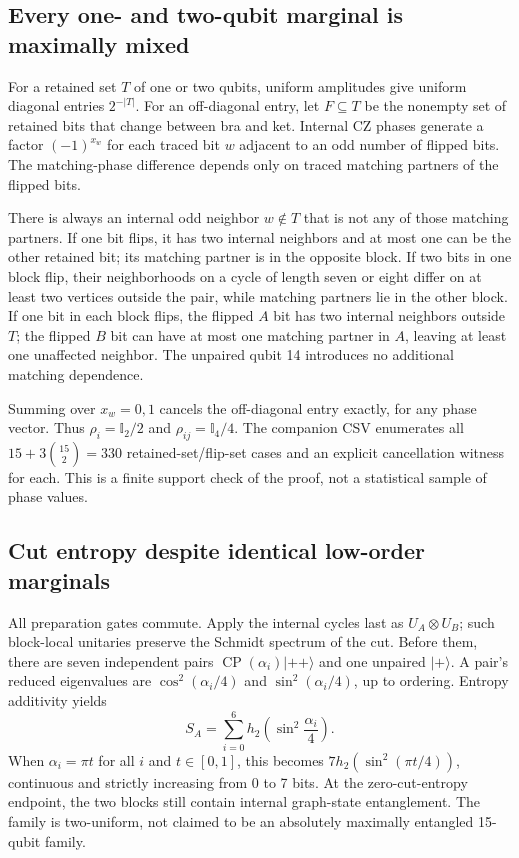 \documentclass[11pt,a4paper]{article}
\begin{document}
\subsection{Every one- and two-qubit marginal is maximally mixed}
For a retained set $T$ of one or two qubits, uniform amplitudes give uniform diagonal entries $2^{-|T|}$. For an off-diagonal entry, let $F\subseteq T$ be the nonempty set of retained bits that change between bra and ket. Internal CZ phases generate a factor $(-1)^{x_w}$ for each traced bit $w$ adjacent to an odd number of flipped bits. The matching-phase difference depends only on traced matching partners of the flipped bits.

There is always an internal odd neighbor $w\notin T$ that is not any of those matching partners. If one bit flips, it has two internal neighbors and at most one can be the other retained bit; its matching partner is in the opposite block. If two bits in one block flip, their neighborhoods on a cycle of length seven or eight differ on at least two vertices outside the pair, while matching partners lie in the other block. If one bit in each block flips, the flipped $A$ bit has two internal neighbors outside $T$; the flipped $B$ bit can have at most one matching partner in $A$, leaving at least one unaffected neighbor. The unpaired qubit 14 introduces no additional matching dependence.

Summing over $x_w=0,1$ cancels the off-diagonal entry exactly, for any phase vector. Thus $\rho_i=\mathbb I_2/2$ and $\rho_{ij}=\mathbb I_4/4$. The companion CSV enumerates all $15+3\binom{15}{2}=330$ retained-set/flip-set cases and an explicit cancellation witness for each. This is a finite support check of the proof, not a statistical sample of phase values.

\subsection{Cut entropy despite identical low-order marginals}
All preparation gates commute. Apply the internal cycles last as $U_A\otimes U_B$; such block-local unitaries preserve the Schmidt spectrum of the cut. Before them, there are seven independent pairs $\operatorname{CP}(\alpha_i)|++\rangle$ and one unpaired $|+\rangle$. A pair's reduced eigenvalues are $\cos^2(\alpha_i/4)$ and $\sin^2(\alpha_i/4)$, up to ordering. Entropy additivity yields
\[
S_A=\sum_{i=0}^{6}h_2\left(\sin^2\frac{\alpha_i}{4}\right).
\]
When $\alpha_i=\pi t$ for all $i$ and $t\in[0,1]$, this becomes $7h_2(\sin^2(\pi t/4))$, continuous and strictly increasing from 0 to 7 bits. At the zero-cut-entropy endpoint, the two blocks still contain internal graph-state entanglement. The family is two-uniform, not claimed to be an absolutely maximally entangled 15-qubit family.
\end{document}
